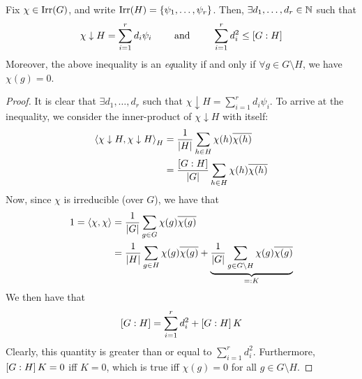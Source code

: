 \begin{proposition} \label{Ch3:Prop:Char_Rest_Bound_Degree}
    Fix $\chi \in \operatorname{Irr}\!\left( G \right)$, and write $\operatorname{Irr}\!\left( H \right) = \left\{ \psi_1, \ldots, \psi_r \right\}$. Then, $\exists d_1, \ldots, d_r \in \mathbb{N}$ such that
    \begin{align*}
        \chi \downarrow H = \sum_{i=1}^{r} d_i \psi_i
        \quad\quad
        \text{ and }
        \quad\quad
        \sum_{i=1}^{r} d_i^2 \leq \left[ G : H \right]
    \end{align*}
    Moreover, the above inequality is an \emph{eq}uality if and only if $\forall g \in G \setminus H$, we have $\chi(g) = 0$.
\end{proposition}
\begin{proof}
    It is clear that $\exists d_1, \ldots, d_r$ such that $\chi \downarrow H = \sum_{i=1}^{r} d_i \psi_i$. To arrive at the inequality, we consider the inner-product of $\chi \downarrow H$ with itself:
    \begin{align*}
        \left\langle \chi \downarrow H, \chi \downarrow H \right\rangle_H &= \frac{1}{\left\lvert H \right\rvert} \sum_{h \in H} \chi(h) \overline{\chi(h)} \\
        &= \frac{\left[ G:H \right]}{\left\lvert G \right\rvert} \sum_{h \in H} \chi(h) \overline{\chi(h)}
    \end{align*}
    Now, since $\chi$ is irreducible (over $G$), we have that
    \begin{align*}
        1 = \left\langle \chi, \chi \right\rangle &= \frac{1}{\left\lvert G \right\rvert} \sum_{g \in G} \chi(g) \overline{\chi(g)} \\
        &= \frac{1}{\left\lvert H \right\rvert} \sum_{g \in H} \chi(g) \overline{\chi(g)} + \underbrace{\frac{1}{\left\lvert G \right\rvert} \sum_{g \in G \setminus H} \chi(g) \overline{\chi(g)}}_{=: K}
    \end{align*}
    We then have that
    \begin{align*}
        \left[ G : H \right] = \sum_{i=1}^{r} d_i^2 + \left[ G : H \right] K
    \end{align*}
    Clearly, this quantity is greater than or equal to $\sum_{i=1}^{r} d_i^2$. Furthermore, $\left[ G : H \right] K = 0$ iff $K = 0$, which is true iff $\chi(g) = 0$ for all $g \in G \setminus H$.
\end{proof}

